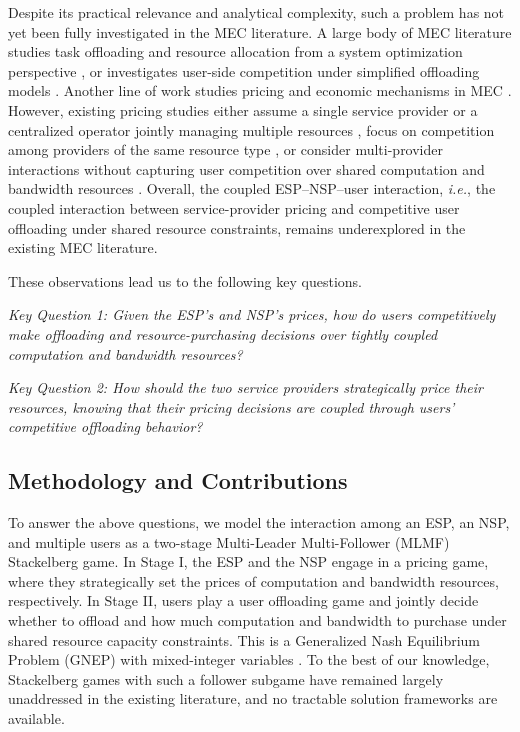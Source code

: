 \documentclass[lettersize,journal]{IEEEtran}
\newcommand{\ie}{\emph{i.e.}}
\begin{document}
Despite its practical relevance and analytical complexity, such a problem has not yet been fully investigated in the MEC literature. A large body of MEC literature studies task offloading and resource allocation from a system optimization perspective \cite{wang2025trust,wei2024quantum,dai2025throughput}, or investigates user-side competition under simplified offloading models \cite{hu2020heterogeneous,chen2024multi,chu2023efficient}. Another line of work studies pricing and economic mechanisms in MEC \cite{chen2024price,tong2024stackelberg,wang2022monetizing,ding2023optimal,tutuncuoglu2024joint,wang2022profit,liu2022resource,wang2023marginal}. However, existing pricing studies either assume a single service provider or a centralized operator jointly managing multiple resources \cite{tong2024stackelberg,wang2022monetizing,tutuncuoglu2024joint,wang2023marginal}, focus on competition among providers of the same resource type \cite{chen2024price,wang2022profit}, or consider multi-provider interactions without capturing user competition over shared computation and bandwidth resources \cite{liu2022resource,ding2023optimal,liao2026cooperative}. Overall, the coupled ESP--NSP--user interaction, \ie, the coupled interaction between service-provider pricing and competitive user offloading under shared resource constraints, remains underexplored in the existing MEC literature.

These observations lead us to the following key questions.

\textit{Key Question 1: Given the ESP’s and NSP’s prices, how do users competitively make offloading and resource-purchasing decisions over tightly coupled computation and bandwidth resources?}

\textit{Key Question 2: How should the two service providers strategically price their resources, knowing that their pricing decisions are coupled through users’ competitive offloading behavior?}

\subsection{Methodology and Contributions}

To answer the above questions, we model the interaction among an ESP, an NSP, and multiple users as a two-stage Multi-Leader Multi-Follower (MLMF) Stackelberg game. In Stage I, the ESP and the NSP engage in a pricing game, where they strategically set the prices of computation and bandwidth resources, respectively. In Stage II, users play a user offloading game and jointly decide whether to offload and how much computation and bandwidth to purchase under shared resource capacity constraints. This is a Generalized Nash Equilibrium Problem (GNEP) with mixed-integer variables \cite{sagratella2017algorithms,harks2025generalized}.
To the best of our knowledge, Stackelberg games with such a follower subgame have remained largely unaddressed in the existing literature, and no tractable solution frameworks are available.
\end{document}
